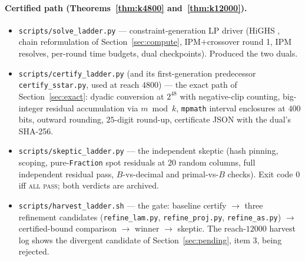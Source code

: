 \documentclass[11pt]{article}
\theoremstyle{remark}
\begin{document}
\paragraph{Certified path (Theorems~\ref{thm:k4800} and~\ref{thm:k12000}).}
\begin{itemize}
\item \texttt{scripts/solve\_ladder.py} --- constraint-generation LP
driver (HiGHS \cite{HiGHS18}, chain reformulation of
Section~\ref{sec:compute}, IPM$+$crossover round 1, IPM resolves,
per-round time budgets, dual checkpoints). Produced the two duals.
\item \texttt{scripts/certify\_ladder.py} (and its first-generation
predecessor \texttt{certify\_sstar.py}, used at reach $4800$) --- the
exact path of Section~\ref{sec:exact}: dyadic conversion at $2^{48}$ with
negative-clip counting, big-integer residual accumulation via $m \bmod k$,
\texttt{mpmath} interval enclosures at $400$ bits, outward rounding,
$25$-digit round-up, certificate JSON with the dual's SHA-256.
\item \texttt{scripts/skeptic\_ladder.py} --- the independent skeptic
(hash pinning, scoping, pure-\texttt{Fraction} spot residuals at $20$
random columns, full independent residual pass, $B$-vs-decimal and
primal-vs-$B$ checks). Exit code $0$ iff \textsc{all pass}; both verdicts
are archived.
\item \texttt{scripts/harvest\_ladder.sh} --- the gate: baseline certify
$\to$ three refinement candidates (\texttt{refine\_lam.py},
\texttt{refine\_proj.py}, \texttt{refine\_as.py}) $\to$ certified-bound
comparison $\to$ winner $\to$ skeptic. The reach-$12000$ harvest log shows
the divergent candidate of Section~\ref{sec:pending}, item 3, being
rejected.
\end{itemize}
\end{document}
